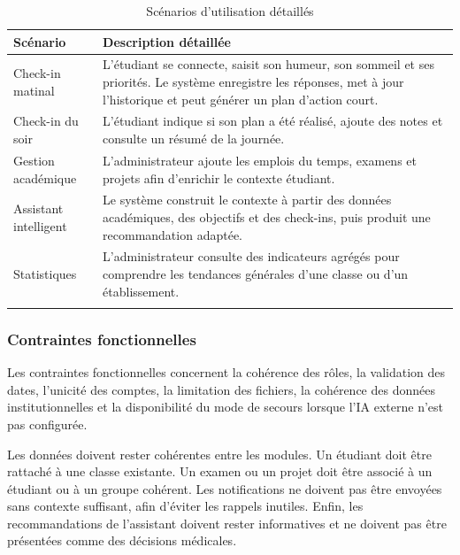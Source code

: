 \documentclass{rapportENSET}
\begin{document}
\begin{longtable}{@{}L{0.25\textwidth}L{0.65\textwidth}@{}}
\toprule
\textbf{Scénario} & \textbf{Description détaillée} \\
\midrule
\endhead
Check-in matinal & L'étudiant se connecte, saisit son humeur, son sommeil et ses priorités. Le système enregistre les réponses, met à jour l'historique et peut générer un plan d'action court. \\
Check-in du soir & L'étudiant indique si son plan a été réalisé, ajoute des notes et consulte un résumé de la journée. \\
Gestion académique & L'administrateur ajoute les emplois du temps, examens et projets afin d'enrichir le contexte étudiant. \\
Assistant intelligent & Le système construit le contexte à partir des données académiques, des objectifs et des check-ins, puis produit une recommandation adaptée. \\
Statistiques & L'administrateur consulte des indicateurs agrégés pour comprendre les tendances générales d'une classe ou d'un établissement. \\
\bottomrule
\caption{Scénarios d'utilisation détaillés}
\end{longtable}

\subsubsection*{Contraintes fonctionnelles}
Les contraintes fonctionnelles concernent la cohérence des rôles, la validation des dates, l'unicité des comptes, la limitation des fichiers, la cohérence des données institutionnelles et la disponibilité du mode de secours lorsque l'IA externe n'est pas configurée.

Les données doivent rester cohérentes entre les modules. Un étudiant doit être rattaché à une classe existante. Un examen ou un projet doit être associé à un étudiant ou à un groupe cohérent. Les notifications ne doivent pas être envoyées sans contexte suffisant, afin d'éviter les rappels inutiles. Enfin, les recommandations de l'assistant doivent rester informatives et ne doivent pas être présentées comme des décisions médicales.
\end{document}
